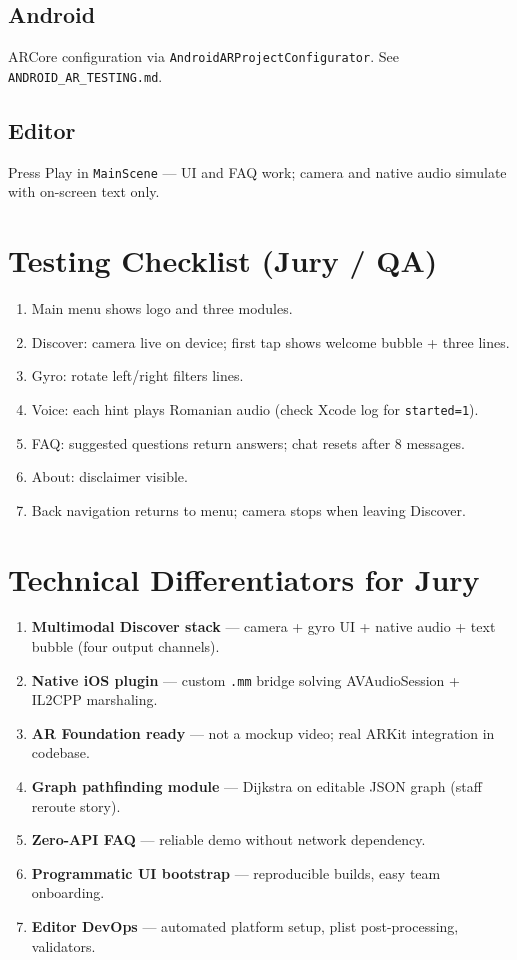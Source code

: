 \documentclass[11pt,a4paper]{article}
\begin{document}
\subsection{Android}

ARCore configuration via \texttt{AndroidARProjectConfigurator}. See \texttt{ANDROID\_AR\_TESTING.md}.

\subsection{Editor}

Press Play in \texttt{MainScene} --- UI and FAQ work; camera and native audio simulate with on-screen text only.

\section{Testing Checklist (Jury / QA)}

\begin{enumerate}
    \item Main menu shows logo and three modules.
    \item Discover: camera live on device; first tap shows welcome bubble + three lines.
    \item Gyro: rotate left/right filters lines.
    \item Voice: each hint plays Romanian audio (check Xcode log for \texttt{started=1}).
    \item FAQ: suggested questions return answers; chat resets after 8 messages.
    \item About: disclaimer visible.
    \item Back navigation returns to menu; camera stops when leaving Discover.
\end{enumerate}

\section{Technical Differentiators for Jury}

\begin{techbox}
\begin{enumerate}[noitemsep]
    \item \textbf{Multimodal Discover stack} --- camera + gyro UI + native audio + text bubble (four output channels).
    \item \textbf{Native iOS plugin} --- custom \texttt{.mm} bridge solving AVAudioSession + IL2CPP marshaling.
    \item \textbf{AR Foundation ready} --- not a mockup video; real ARKit integration in codebase.
    \item \textbf{Graph pathfinding module} --- Dijkstra on editable JSON graph (staff reroute story).
    \item \textbf{Zero-API FAQ} --- reliable demo without network dependency.
    \item \textbf{Programmatic UI bootstrap} --- reproducible builds, easy team onboarding.
    \item \textbf{Editor DevOps} --- automated platform setup, plist post-processing, validators.
\end{enumerate}
\end{techbox}
\end{document}
